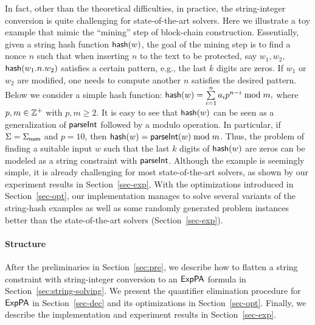 In fact, other than the theoretical difficulties, in practice, the string-integer conversion is quite challenging for state-of-the-art solvers. 
Here we illustrate a toy example that mimic the ``mining'' step of block-chain construction. 
Essentially, given a string hash function ${\sf hash}(w)$, the goal of the mining step is to find a nonce $n$ such that when inserting $n$ to the text to be protected, say $w_1,w_2$, ${\sf hash}(w_1.n.w_2)$ satisfies a certain pattern, e.g., the last $k$ digits are zeros. 
If $w_1$ or $w_2$ are modified, one needs to compute another $n$ satisfies the desired pattern.
Below we consider a simple hash function:
${\sf hash}(w) = \sum \limits_{i = 1}^n a_i p^{n-i} \bmod m,$
where $p, m \in \mathbb{Z}^+$ with $p, m \ge 2$. 
It is easy to see that ${\sf hash}(w)$ can be seen as a generalization of $\textsf{parseInt}$ followed by a modulo operation. 
In particular, if $\Sigma = \Sigma_{\sf num}$ and $p = 10$, then ${\sf hash}(w) = \textsf{parseInt}(w) \bmod m$. Thus, the problem of finding a suitable input $w$ such that the last $k$ digits of ${\sf hash}(w)$ are zeros can be modeled as a string constraint with $\textsf{parseInt}$. Although the example is seemingly simple, it is already challenging for most state-of-the-art solvers, as shown by our experiment results in Section~\ref{sec-exp}. 
With the optimizations introduced in Section~\ref{sec-opt}, 
our implementation manages to solve several variants of the string-hash examples as well as some randomly generated problem instances better than the state-of-the-art solvers (Section~\ref{sec-exp}). 
 
\paragraph*{Structure}
After the preliminaries in Section~\ref{sec:pre}, we describe how to flatten a string constraint with string-integer conversion to an ${\sf ExpPA}$ formula in Section~\ref{sec:string-solving}. We present the quantifier elimination procedure for ${\sf ExpPA}$ in Section~\ref{sec-dec} and its optimizations in Section~\ref{sec-opt}. Finally, we describe the implementation and experiment results in Section~\ref{sec-exp}.


